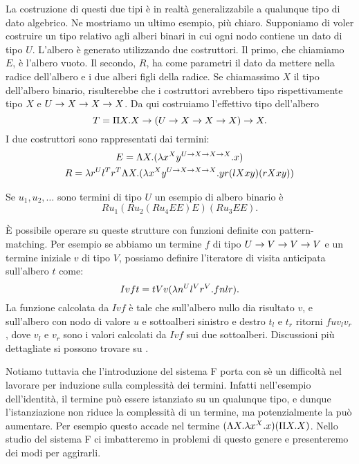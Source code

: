 \documentclass[]{marticle}
\begin{document}
La costruzione di questi due tipi \`e in realt\`a generalizzabile a qualunque
tipo di dato algebrico. Ne mostriamo un ultimo esempio, pi\`u chiaro. Supponiamo
di voler costruire un tipo relativo agli alberi binari in cui ogni nodo contiene
un dato di tipo $U$. L'albero \`e generato utilizzando due costruttori. Il
primo, che chiamiamo $E$, \`e l'albero vuoto. Il secondo, $R$, ha come parametri
il dato da mettere nella radice dell'albero e i due alberi figli della radice.
Se chiamassimo $X$ il tipo dell'albero binario, risulterebbe che i costruttori
avrebbero tipo rispettivamente tipo $X$ e $U \rightarrow X\rightarrow X \rightarrow X$. Da qui
costruiamo l'effettivo tipo dell'albero
\[
    T = \Pi X. X \rightarrow (U \rightarrow X \rightarrow X \rightarrow X) \rightarrow X.
\]
I due costruttori sono rappresentati dai termini:
\begin{gather*}
    E = \Lambda X. (\lambda x^X y^{U \rightarrow X \rightarrow X \rightarrow X}.x) \\
    R = \lambda r^U l^T r^T \Lambda X. (\lambda x^X y^{U \rightarrow X \rightarrow X \rightarrow X}.yr(lXxy)(rXxy))
\end{gather*}

Se $u_1, u_2,\dots$ sono termini di tipo $U$ un esempio di albero binario \`e 
\[
    Ru_1(Ru_2(Ru_4EE)E)(Ru_3EE).
\]

\`E possibile operare su queste strutture con funzioni definite con
pattern-matching. Per esempio se abbiamo un termine $f$ di tipo $U\rightarrow V \rightarrow V\rightarrow V$
e un termine iniziale $v$ di tipo $V$, possiamo definire l'iteratore di visita
anticipata sull'albero $t$ come:
\[
    Ivft = tVv(\lambda n^U l^V r^V. f nlr).
\]
La funzione calcolata da $Ivf$ \`e tale che sull'albero nullo dia risultato $v$,
e sull'albero con nodo di valore $u$ e sottoalberi sinistro e destro $t_l$ e
$t_r$ ritorni $f u v_l v_r$, dove $v_l$ e $v_r$ sono i valori calcolati da $Ivf$
sui due sottoalberi. Discussioni pi\`u dettagliate si possono trovare su
\cite{fortune}.

Notiamo tuttavia che l'introduzione del sistema F porta con s\`e un difficolt\`a
nel lavorare per induzione sulla complessit\`a dei termini. Infatti nell'esempio
dell'identit\`a, il termine pu\`o essere istanziato su un qualunque tipo, e
dunque l'istanziazione non riduce la complessit\`a di un termine, ma
potenzialmente la pu\`o aumentare. Per esempio questo accade nel termine $(\Lambda X.
\lambda x^X. x)(\Pi X. X)$. Nello studio del sistema F ci imbatteremo in problemi di
questo genere e presenteremo dei modi per aggirarli.
\end{document}
